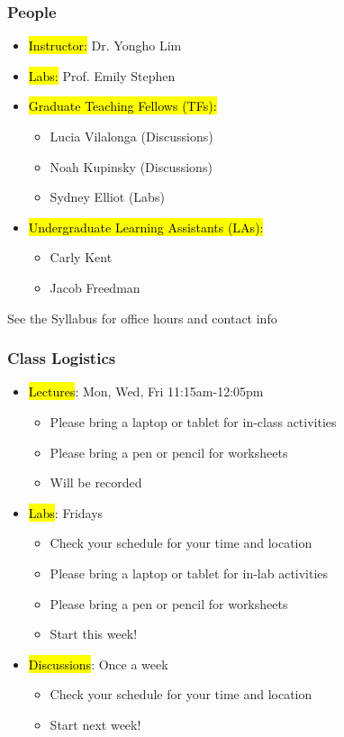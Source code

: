 \documentclass[11pt,containsverbatim,handout]{beamer}
\begin{document}
\begin{frame}
	\frametitle{People}
	\begin{itemize}
		\item \hl{Instructor:} Dr. Yongho Lim
		\item \hl{Labs:} Prof. Emily Stephen
		\item \hl{Graduate Teaching Fellows (TFs):} 
		\begin{itemize}
			\item Lucia Vilalonga (Discussions)
			\item Noah Kupinsky (Discussions)
			\item Sydney Elliot (Labs)
		\end{itemize}
		\item \hl{Undergraduate Learning Assistants (LAs):}
		\begin{itemize}
			\item Carly Kent
			\item Jacob Freedman
		\end{itemize}
	\end{itemize}

	See the Syllabus for office hours and contact info
\end{frame}

\begin{frame}
	\frametitle{Class Logistics}
	\begin{itemize}
		\item \hl{Lectures}: Mon, Wed, Fri 11:15am-12:05pm
		\begin{itemize}
			\item Please bring a laptop or tablet for in-class activities
			\item Please bring a pen or pencil for worksheets
			\item Will be recorded
		\end{itemize}
		\item \hl{Labs}: Fridays
		\begin{itemize}
			\item Check your schedule for your time and location
			\item Please bring a laptop or tablet for in-lab activities
			\item Please bring a pen or pencil for worksheets
			\item Start this week!
		\end{itemize}
		\item \hl{Discussions}: Once a week
		\begin{itemize}
			\item Check your schedule for your time and location
			\item Start next week!
		\end{itemize}
	\end{itemize}
\end{frame}
\end{document}
